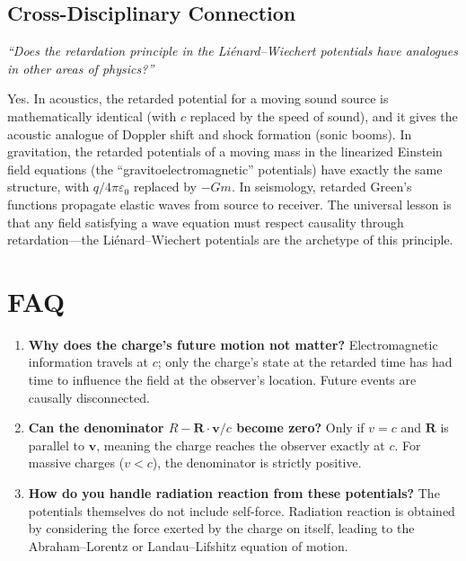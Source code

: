 \subsection*{Cross-Disciplinary Connection}
\textit{``Does the retardation principle in the Liénard--Wiechert potentials have analogues in other areas of physics?''}

Yes. In acoustics, the retarded potential for a moving sound source is mathematically identical (with $c$ replaced by the speed of sound), and it gives the acoustic analogue of Doppler shift and shock formation (sonic booms). In gravitation, the retarded potentials of a moving mass in the linearized Einstein field equations (the ``gravitoelectromagnetic'' potentials) have exactly the same structure, with $q/4\pi\varepsilon_{0}$ replaced by $-Gm$. In seismology, retarded Green's functions propagate elastic waves from source to receiver. The universal lesson is that any field satisfying a wave equation must respect causality through retardation---the Liénard--Wiechert potentials are the archetype of this principle.

\section*{FAQ}

\begin{enumerate}
\item \textbf{Why does the charge's future motion not matter?}
Electromagnetic information travels at $c$; only the charge's state at the retarded time has had time to influence the field at the observer's location. Future events are causally disconnected.

\item \textbf{Can the denominator $R - \mathbf{R}\cdot\mathbf{v}/c$ become zero?}
Only if $v = c$ and $\mathbf{R}$ is parallel to $\mathbf{v}$, meaning the charge reaches the observer exactly at $c$. For massive charges ($v < c$), the denominator is strictly positive.

\item \textbf{How do you handle radiation reaction from these potentials?}
The potentials themselves do not include self-force. Radiation reaction is obtained by considering the force exerted by the charge on itself, leading to the Abraham--Lorentz or Landau--Lifshitz equation of motion.
\end{enumerate}

